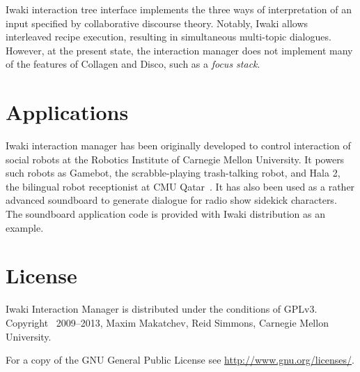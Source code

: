 Iwaki interaction tree interface implements the three ways of interpretation of an input specified by collaborative discourse theory. Notably, Iwaki allows interleaved recipe execution, resulting in simultaneous multi-topic dialogues. However, at the present state, the interaction manager does not implement many of the features of Collagen and Disco, such as a \textsl{focus stack}.

\section{Applications}


Iwaki interaction manager has been originally developed to control interaction of social robots at the Robotics Institute of Carnegie Mellon University. It powers such robots as Gamebot, the scrabble-playing trash-talking robot, and Hala 2, the bilingual robot receptionist at CMU Qatar~\citep{Simmons2011}. It has also been used as a rather advanced soundboard to generate dialogue for radio show sidekick characters. The soundboard application code is provided with Iwaki distribution as an example.

\section{License}

Iwaki Interaction Manager is distributed under the conditions of GPLv3. Copyright \textcopyright\ 2009--2013, Maxim Makatchev, Reid Simmons, Carnegie Mellon University. 

For a copy of the GNU General Public License see \url{http://www.gnu.org/licenses/}.